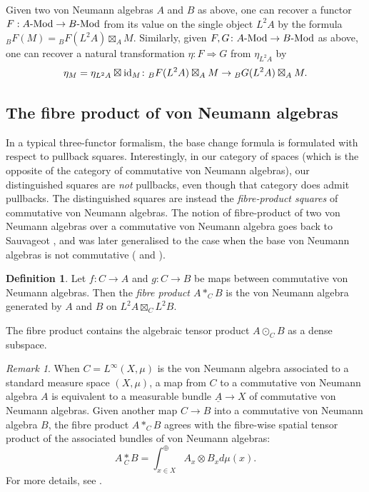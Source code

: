 \documentclass[10pt,a4paper,oneside]{amsart}
\theoremstyle{remark}
\newtheorem{remark}[theorem]{Remark}
\theoremstyle{definition}
\newtheorem{definition}[theorem]{Definition}
\newcommand{\lmod}[1]{#1\textnormal{-Mod}}
\newcommand{\rar}{\rightarrow}
\newcommand{\id}{\textnormal{id}}
\newcommand{\cofu}[1]{\mathop{\boxtimes}_{#1}}
\newcommand{\tens}[1]{\mathop{*}\limits_{#1}}
\newcommand{\vn}[1]{{#1}}
\newcommand{\ms}{(X,\mu)}
\begin{document}
\noindent Given two von Neumann algebras $A$ and $B$ as above,
one can recover a functor $F:\lmod{A}\rightarrow \lmod{B}$ from its value on the single object $L^2A$  by the formula ${}_BF(M)={}_BF(L^2A)\boxtimes_A M$. Similarly, given $F, G\colon \lmod{A}\rar \lmod{B}$ as above, one can recover a natural transformation $\eta\colon F \Rightarrow G$ from $\eta_{L^2A}$ by
\begin{equation}\label{eq: nat transf -- generator argument}
\eta_M=\eta_{L^2A}\boxtimes \id_M\colon {}_BF(L^2A)\boxtimes_{A} M\rar {}_BG(L^2A)\boxtimes_{A} M .
\end{equation}



\subsection{The fibre product of von Neumann algebras}
In a typical three-functor formalism, the base change formula is formulated with respect to pullback squares.
Interestingly, in our category of spaces (which is the opposite of the category of commutative von Neumann algebras), our distinguished squares are \emph{not} pullbacks, even though that category does admit pullbacks.
%
The distinguished squares are instead the \emph{fibre-product squares} of commutative von Neumann algebras.
The notion of fibre-product of two von Neumann algebras over a commutative von Neumann algebra goes back to Sauvageot \cite{Sauvageot1985}, and was later generalised %
to the case when the base von Neumann algebras is not commutative (\cite[\S2.3]{Enock200} and \cite{Timmermann2012}). 

\begin{definition}\label{def:vnfibreprod}
	Let $\vn{f}\colon C\rightarrow A$ and $\vn{g}\colon C\rightarrow B$ be maps between commutative von Neumann algebras. Then the \emph{fibre product $A \ast_{C} B$} is the von Neumann algebra generated by $A$ and $B$ on $ L^2 A \cofu{C} L^2 B$. 
\end{definition}
The fibre product contains the algebraic tensor product $A\odot_C B$ as a dense subspace.
\begin{remark}
	When $C=L^\infty\ms$ is the von Neumann algebra associated to a standard measure space $\ms$, a map from $C$ to a commutative von Neumann algebra $A$ is equivalent to a measurable bundle $\underline{A} \rar X$ of commutative von Neumann algebras. Given another map $C \rar B$ into a commutative von Neumann algebra $B$, the fibre product $A \ast_{C} B$ agrees with the fibre-wise spatial tensor product of the associated bundles of von Neumann algebras:
	$$
	A \tens{C} B = \int^\oplus_{x\in X} A_x \otimes B_x d\mu(x).
	$$
	For more details, see \cite{Sauvageot1985}.
\end{remark}
\end{document}
